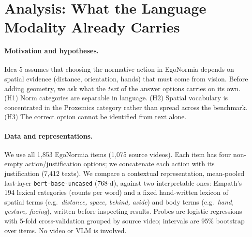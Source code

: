 \section{Analysis: What the Language Modality Already Carries}
\paragraph{Motivation and hypotheses.} Idea 5 assumes that choosing the normative action in EgoNormia depends on spatial evidence (distance, orientation, hands) that must come from vision. Before adding geometry, we ask what the \emph{text} of the answer options carries on its own. (H1) Norm categories are separable in language. (H2) Spatial vocabulary is concentrated in the Proxemics category rather than spread across the benchmark. (H3) The correct option cannot be identified from text alone.
\paragraph{Data and representations.} We use all 1{,}853 EgoNormia items (1{,}075 source videos). Each item has four non-empty action/justification options; we concatenate each action with its justification (7{,}412 texts). We compare a contextual representation, mean-pooled last-layer \texttt{bert-base-uncased} (768-d), against two interpretable ones: Empath's 194 lexical categories (counts per word) and a fixed hand-written lexicon of spatial terms (e.g.\ \emph{distance, space, behind, aside}) and body terms (e.g.\ \emph{hand, gesture, facing}), written before inspecting results. Probes are logistic regressions with 5-fold cross-validation grouped by source video; intervals are 95\% bootstrap over items. No video or VLM is involved.
